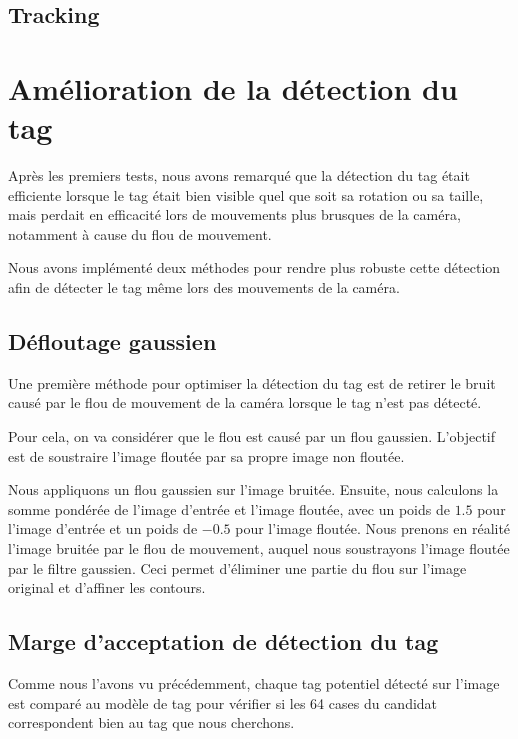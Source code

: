     \subsection{Tracking}

    
    \section{Amélioration de la détection du tag}

    Après les premiers tests, nous avons remarqué que la détection du tag était efficiente lorsque le tag était bien visible quel que soit sa rotation ou sa taille, mais perdait en efficacité lors de mouvements plus brusques de la caméra, notamment à cause du flou de mouvement.

    Nous avons implémenté deux méthodes pour rendre plus robuste cette détection afin de détecter le tag même lors des mouvements de la caméra.

        \subsection{Défloutage gaussien}

        Une première méthode pour optimiser la détection du tag est de retirer le bruit causé par le flou de mouvement de la caméra lorsque le tag n'est pas détecté.

        Pour cela, on va considérer que le flou est causé par un flou gaussien. L'objectif est de soustraire l'image floutée par sa propre image non floutée.

        Nous appliquons un flou gaussien sur l'image bruitée. Ensuite, nous calculons la somme pondérée de l'image d'entrée et l'image floutée, avec un poids de $1.5$ pour l'image d'entrée et un poids de $-0.5$ pour l'image floutée. Nous prenons en réalité l'image bruitée par le flou de mouvement, auquel nous soustrayons l'image floutée par le filtre gaussien. Ceci permet d'éliminer une partie du flou sur l'image original et d'affiner les contours.

        \subsection{Marge d'acceptation de détection du tag}

        Comme nous l'avons vu précédemment, chaque tag potentiel détecté sur l'image est comparé au modèle de tag pour vérifier si les 64 cases du candidat correspondent bien au tag que nous cherchons.

